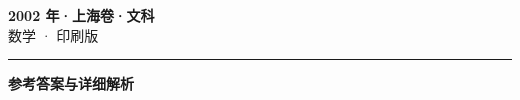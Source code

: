 \documentclass[zihao=5, a4paper]{ctexart}
\begin{document}
\begin{center}
  {\Large\bfseries 2002 年·上海卷·文科}\\[4pt]
  {\large 数学 · 印刷版}
\end{center}
\medskip
{}

\par\bigskip\hrule\bigskip
{}
\begin{center}{\large\bfseries 参考答案与详细解析}\end{center}
\smallskip

\end{document}
